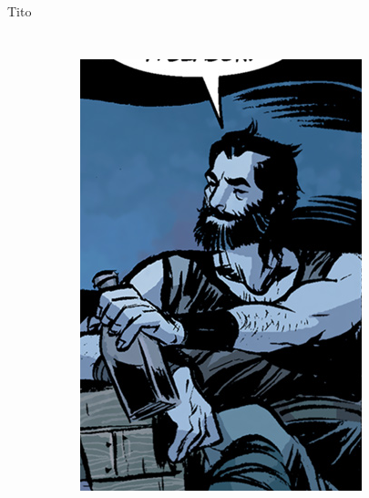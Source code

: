 \begin{frame}{Tito}
\begin{columns}
\begin{figure}[htp]
\begin{subfigure}[b]{0.27\textwidth}
				\includegraphics[width=\textwidth]{img/tito/DH}
			\end{subfigure}
			~
			\begin{subfigure}[b]{0.23\textwidth}

\end{subfigure}
\end{figure}
\end{columns}
\end{frame}
